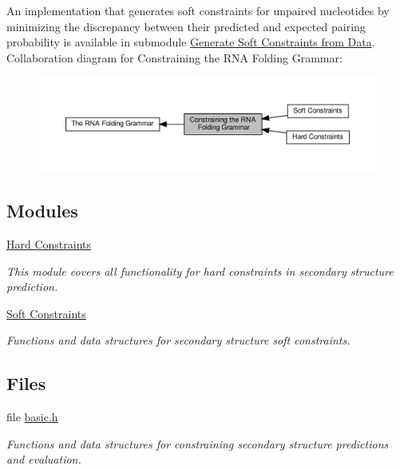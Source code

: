 An implementation that generates soft constraints for unpaired nucleotides by minimizing the discrepancy between their predicted and expected pairing probability is available in submodule \hyperlink{group__perturbation}{Generate Soft Constraints from Data}. Collaboration diagram for Constraining the R\+NA Folding Grammar\+:
\nopagebreak
\begin{figure}[H]
\begin{center}
\leavevmode
\includegraphics[width=350pt]{group__constraints}
\end{center}
\end{figure}
\subsection*{Modules}
\begin{DoxyCompactItemize}
\item 
\hyperlink{group__hard__constraints}{Hard Constraints}
\begin{DoxyCompactList}\small\item\em This module covers all functionality for hard constraints in secondary structure prediction. \end{DoxyCompactList}\item 
\hyperlink{group__soft__constraints}{Soft Constraints}
\begin{DoxyCompactList}\small\item\em Functions and data structures for secondary structure soft constraints. \end{DoxyCompactList}\end{DoxyCompactItemize}
\subsection*{Files}
\begin{DoxyCompactItemize}
\item 
file \hyperlink{constraints_2basic_8h}{basic.\+h}
\begin{DoxyCompactList}\small\item\em Functions and data structures for constraining secondary structure predictions and evaluation. \end{DoxyCompactList}\end{DoxyCompactItemize}
